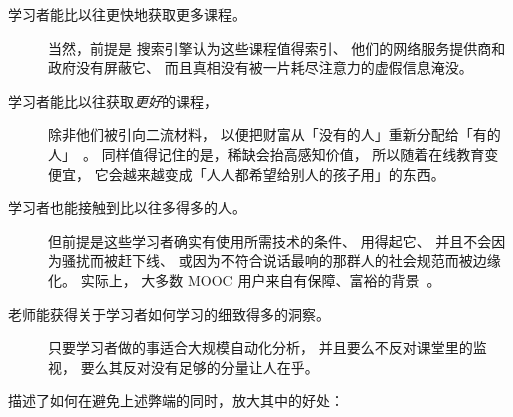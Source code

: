 \begin{description}

\item[学习者能比以往更快地获取更多课程。]
  当然，前提是
  搜索引擎认为这些课程值得索引、
  他们的网络服务提供商和政府没有屏蔽它、
  而且真相没有被一片耗尽注意力的虚假信息淹没。

\item[学习者能比以往获取\emph{更好}的课程，]
  除非他们被引向二流材料，
  以便把财富从「没有的人」重新分配给「有的人」~\cite{McMi2017}。
  同样值得记住的是，稀缺会抬高感知价值，
  所以随着在线教育变便宜，
  它会越来越变成「人人都希望给别人的孩子用」的东西。

\item[学习者也能接触到比以往多得多的人。]
  但前提是这些学习者确实有使用所需技术的条件、
  用得起它、
  并且不会因为骚扰而被赶下线、
  或因为不符合说话最响的那群人的社会规范而被边缘化。
  实际上，
  大多数 MOOC 用户来自有保障、富裕的背景~\cite{Hans2015}。

\item[老师能获得关于学习者如何学习的细致得多的洞察。]
  只要学习者做的事适合大规模自动化分析，
  并且要么不反对课堂里的监视，
  要么其反对没有足够的分量让人在乎。

\end{description}

\cite{Marg2015,Mill2016a,Nils2017}描述了如何在避免上述弊端的同时，放大其中的好处：

